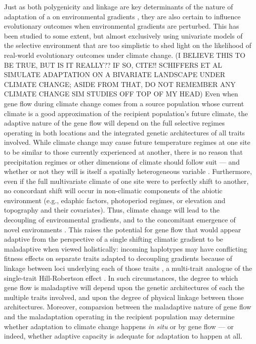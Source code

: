 \documentclass[9pt,twocolumn,twoside,lineno]{pnas-new}
\begin{document}
Just as both polygenicity and linkage
are key determinants of the nature of adaptation of a 
on environmental gradients \cite{barton,yeaman_whitlock,yeaman_review,lecorre},
they are also certain to influence evolutionary
outcomes when environmental gradients are perturbed.
This has been studied to some extent,
but almost exclusively using univariate
models of the selective environment
that are too simplistic to
shed light on the likelihood of
real-world evolutionary outcomes
under climate change.
(I BELIEVE THIS TO BE TRUE, BUT IS IT REALLY?? IF SO, CITE!!
SCHIFFERS ET AL SIMULATE ADAPTATION ON A BIVARIATE LANDSCAPE UNDER CLIMATE CHANGE;
ASIDE FROM THAT, DO NOT REMEMBER ANY CLIMATE CHANGE
SIM STUDIES OFF TOP OF MY HEAD)
Even when gene 
flow during climate change comes from a source population whose current climate is a 
good approximation of the recipient population’s future climate, the adaptive nature 
of the gene flow will depend on the full selective regimes operating in both locations
and the integrated genetic architectures of all traits involved. 
While climate change may cause 
future temperature regimes at one site to be similar to those currently 
experienced at another, there is no reason that precipitation regimes or other
dimensions of climate should follow suit --- and whether or not they will is 
itself a spatially heterogeneous variable \cite{crimmins,daly}.
Furthermore, even if the full multivariate climate of one site were to 
perfectly shift to another, no concordant shift will occur in
non-climatic components of the abiotic environment (e.g., edaphic factors, photoperiod 
regimes, or elevation and topography and their covariates). 
Thus, climate change will 
lead to the decoupling of environmental gradients, 
and to the concomitant emergence of novel environments \cite{williams_novel_climates,williams_projected_novel_disappearing,fitzpatrick_climate_novelty_forecasts}. 
This raises the potential for gene flow that would appear adaptive
from the perspective of a single shifting climatic gradient
to be maladaptive when viewed holistically: 
incoming haplotypes may have conflicting fitness effects on separate traits
adapted to decoupling gradients
because of linkage between loci underlying each of those traits \cite{aitken_whitlock,schiffers},
a multi-trait analogue of the single-trait Hill-Robertson effect \cite{hill_robertson}. 
In such circumstances, the degree to which gene flow is maladaptive will depend
upon the genetic architectures of each the multiple traits involved,
and upon the degree of physical linkage between those architectures.
Moreover, comparsion between the maladaptive nature of gene flow
and the maladaptation operating in the recipient population
may determine whether adaptation to climate change happens
\textit{in situ} or by gene flow --- or indeed,
whether adaptive capacity is adequate for adaptation to happen at all.
\end{document}
